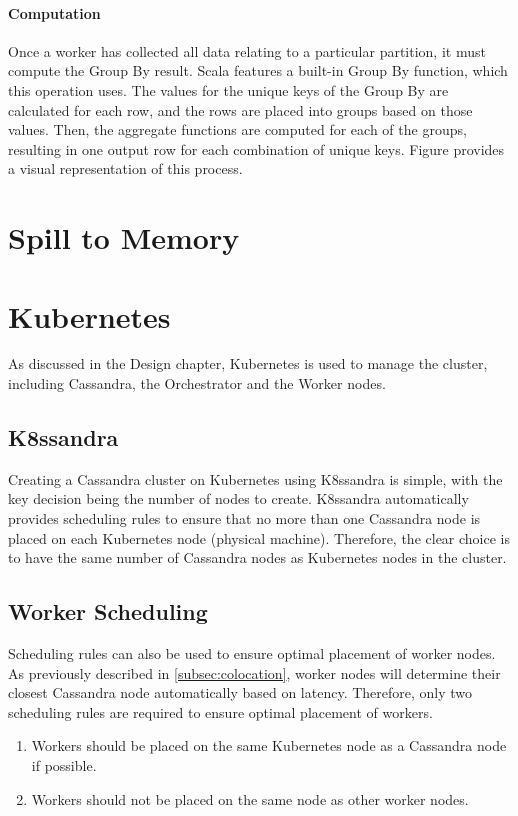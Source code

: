 
\paragraph{Computation}
Once a worker has collected all data relating to a particular partition, it must compute the Group By result. Scala features a built-in Group By function, which this operation uses. The values for the unique keys of the Group By are calculated for each row, and the rows are placed into groups based on those values. Then, the aggregate functions are computed for each of the groups, resulting in one output row for each combination of unique keys. Figure  provides a visual representation of this process.



\section{Spill to Memory}

\section{Kubernetes}
As discussed in the Design chapter, Kubernetes is used to manage the cluster, including Cassandra, the Orchestrator and the Worker nodes.

\subsection{K8ssandra}
Creating a Cassandra cluster on Kubernetes using K8ssandra is simple, with the key decision being the number of nodes to create. K8ssandra automatically provides scheduling rules to ensure that no more than one Cassandra node is placed on each Kubernetes node (physical machine). Therefore, the clear choice is to have the same number of Cassandra nodes as Kubernetes nodes in the cluster.

\subsection{Worker Scheduling}
Scheduling rules can also be used to ensure optimal placement of worker nodes. As previously described in \ref{subsec:colocation}, worker nodes will determine their closest Cassandra node automatically based on latency. Therefore, only two scheduling rules are required to ensure optimal placement of workers.
\begin{enumerate}
	\item Workers should be placed on the same Kubernetes node as a Cassandra node if possible.
	\item Workers should not be placed on the same node as other worker nodes.
\end{enumerate}

